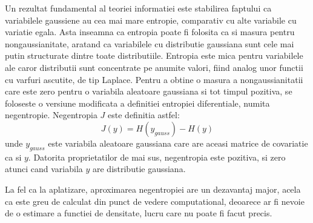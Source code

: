 \documentclass[12pt]{article}
\begin{document}
Un rezultat fundamental al teoriei informatiei este stabilirea faptului ca variabilele gaussiene au cea mai mare entropie, comparativ cu alte variabile cu variatie egala. Asta inseamna ca entropia poate fi folosita ca si masura pentru nongaussianitate, aratand ca variabilele cu distributie gaussiana sunt cele mai putin structurate dintre toate distributiile. Entropia este mica pentru variabilele ale caror distributii sunt concentrate pe anumite valori, fiind analog unor functii cu varfuri ascutite, de tip Laplace. Pentru a obtine o masura a nongaussianitatii care este zero pentru o variabila aleatoare gaussiana si tot timpul pozitiva, se foloseste o versiune modificata a definitiei entropiei diferentiale, numita negentropie. Negentropia $J$ este definitia astfel:
\begin{equation}
	J(y)=H(y_{gauss})-H(y)	
\end{equation}
unde $y_{gauss}$ este variabila aleatoare gaussiana care are aceasi matrice de covariatie ca si $y$. Datorita proprietatilor de mai sus, negentropia este pozitiva, si zero atunci cand variabila $y$ are distributie gaussiana. 

La fel ca la aplatizare, aproximarea negentropiei are un dezavantaj major, acela ca este greu de calculat din punct de vedere computational, deoarece ar fi nevoie de o estimare a functiei de densitate, lucru care nu poate fi facut precis. 
\end{document}
